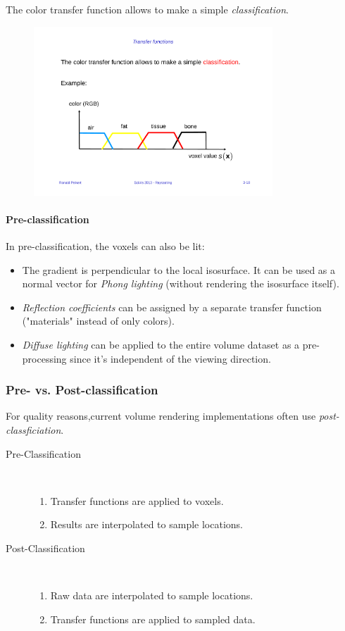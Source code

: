 The color transfer function allows to make a simple \emph{classification}.
\begin{figure}[H]
    \centering
    \includegraphics[width=0.8\textwidth,page=1]{img/03_tf_color}
\end{figure}

\paragraph{Pre-classification} In pre-classification, the voxels can also be lit:
\begin{itemize}
    \item The gradient is perpendicular to the local isosurface. It can be used as a normal vector for \emph{Phong lighting} (without rendering the isosurface itself).
    \item \emph{Reflection coefficients} can be assigned by a separate transfer function ("materials" instead of only colors).
    \item \emph{Diffuse lighting} can be applied to the entire volume dataset as a pre-processing since it's independent of the viewing direction.
\end{itemize}

\subsubsection{Pre- vs. Post-classification}
For quality reasons,current volume rendering implementations often use \emph{post-classficiation}.

\begin{description}
\item[Pre-Classification] $\ $
    \begin{enumerate}
        \item Transfer functions are applied to voxels.
        \item Results are interpolated to sample locations.
    \end{enumerate}
\item[Post-Classification] $\ $
    \begin{enumerate}
        \item Raw data are interpolated to sample locations.
        \item Transfer functions are applied to sampled data.
    \end{enumerate}
\end{description}

